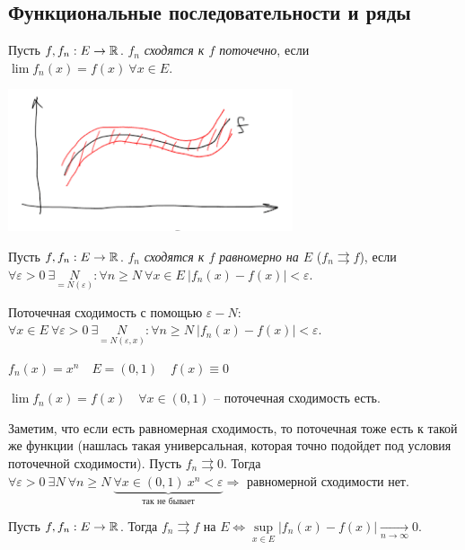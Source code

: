 \subsection{Функциональные последовательности и ряды}

\begin{definition}
    Пусть $f, f_n:E\rightarrow \mathbb{R}$. $f_n$ \textit{сходятся к $f$ поточечно}, если $\lim f_n(x)=f(x)\  \forall x\in E$.
\end{definition}

\includegraphics[width=0.4\linewidth]{images/19-04-1.png}

\begin{definition}
    Пусть $f, f_n : E \rightarrow \mathbb{R}$. $f_n$ \textit{сходятся к $f$ равномерно на $E$} ($f_n\rightrightarrows f$), если $\forall \varepsilon > 0\ \exists \underset{=N(\varepsilon)}{N}: \forall n\geq N\ \forall x\in E\ |f_n(x)-f(x)|< \varepsilon$.
\end{definition}

\begin{remark}
    Поточечная сходимость с помощью $\varepsilon-N$: $\forall x\in E\ \forall \varepsilon > 0\ \exists \underset{=N(\varepsilon, x)}{N}: \forall n\geq N\ |f_n(x)-f(x)|< \varepsilon$.
\end{remark}

\begin{remark}
    $f_n(x)=x^n\quad E=(0, 1)\quad f(x)\equiv 0$

    $\lim f_n(x)=f(x)\quad \forall x\in (0, 1)$ – поточечная сходимость есть.

    Заметим, что если есть равномерная сходимость, то поточечная тоже есть к такой же функции (нашлась такая универсальная, которая точно подойдет под условия поточечной сходимости). Пусть $f_n\rightrightarrows 0$. Тогда $ \forall \varepsilon > 0\ \exists N\ \forall n \geq N\ \underbrace{\forall x\in (0, 1)\ x^n< \varepsilon}_{\text{так не бывает}}\Rightarrow$  равномерной сходимости нет.
\end{remark}

\begin{theorem}
    Пусть $f, f_n:E\rightarrow \mathbb{R}$. Тогда $f_n \rightrightarrows f$ на $E\Leftrightarrow \sup\limits_{x\in E}|f_n(x)- f(x)|\underset{n\rightarrow \infty}{\rightarrow} 0$.
\end{theorem}

